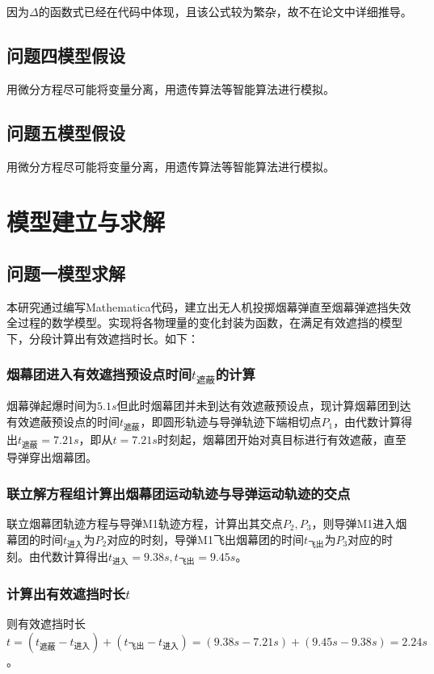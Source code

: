 \documentclass{article}
\begin{document}
因为$\Delta$的函数式已经在代码中体现，且该公式较为繁杂，故不在论文中详细推导。
\subsection{问题四模型假设}
用微分方程尽可能将变量分离，用遗传算法等智能算法进行模拟。

\subsection{问题五模型假设}
用微分方程尽可能将变量分离，用遗传算法等智能算法进行模拟。

\section{模型建立与求解}

\subsection{问题一模型求解}

本研究通过编写Mathematica代码，建立出无人机投掷烟幕弹直至烟幕弹遮挡失效全过程的数学模型。实现将各物理量的变化封装为函数，在满足有效遮挡的模型下，分段计算出有效遮挡时长。如下：

\subsubsection{烟幕团进入有效遮挡预设点时间$t_\text{遮蔽}$的计算}
烟幕弹起爆时间为$5.1s$但此时烟幕团并未到达有效遮蔽预设点，现计算烟幕团到达有效遮蔽预设点的时间$t_\text{遮蔽}$，即圆形轨迹与导弹轨迹下端相切点$P_1$，由代数计算得出$t_\text{遮蔽} = 7.21s$，即从$t=7.21s$时刻起，烟幕团开始对真目标进行有效遮蔽，直至导弹穿出烟幕团。

\subsubsection{联立解方程组计算出烟幕团运动轨迹与导弹运动轨迹的交点}
联立烟幕团轨迹方程与导弹M1轨迹方程，计算出其交点$P_2,P_3$，则导弹M1进入烟幕团的时间$t_{\text{进入}}$为$P_2$对应的时刻，导弹M1飞出烟幕团的时间$t_{\text{飞出}}$为$P_3$对应的时刻。由代数计算得出$t_{\text{进入}} = 9.38s,t_{\text{飞出}} = 9.45s$。

\subsubsection{计算出有效遮挡时长$t$}
则有效遮挡时长$t =(t_\text{遮蔽}- t_\text{进入}) + (t_{\text{飞出}} - t_{\text{进入}}) = (9.38s - 7.21s) + (9.45s - 9.38s) = 2.24s$。
\end{document}
